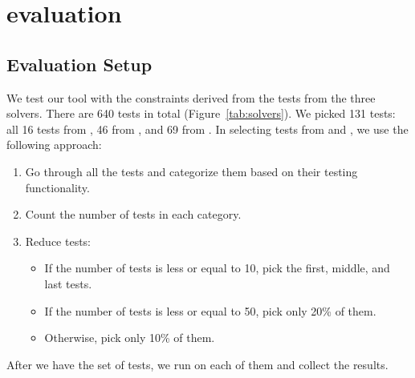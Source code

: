\section{evaluation}
\label{sec:evaluation}
\subsection{Evaluation Setup}
We test our tool with the constraints derived from the tests from the three solvers.
There are 640 tests in total (Figure~\ref{tab:solvers}). We picked 131 tests:
all 16 tests from \dprle, 46 from \zstr, and 69 from \hampi. In selecting tests from \zstr and \hampi,
we use the following approach:
\begin{enumerate}
    \item Go through all the tests and categorize them based on their testing functionality.
    \item Count the number of tests in each category.
    \item Reduce tests:
        \begin{itemize}
            \item If the number of tests is less or equal to 10, pick the first, middle, and last tests.
            \item If the number of tests is less or equal to 50, pick only 20\% of them.
            \item Otherwise, pick only 10\% of them.
        \end{itemize}
\end{enumerate}
After we have the set of tests, we run \imss on each of them and collect the results.
